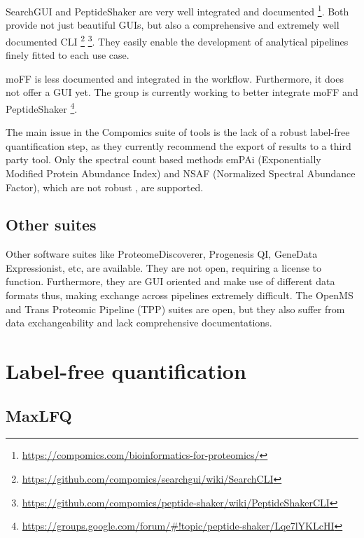 \documentclass[11pt, a4paper]{report}
\begin{document}
SearchGUI and PeptideShaker are very well integrated and documented \footnote{\href{https://compomics.com/bioinformatics-for-proteomics/}{https://compomics.com/bioinformatics-for-proteomics/}}. Both provide not just beautiful GUIs, but also a comprehensive and extremely well documented CLI \footnote{\href{https://github.com/compomics/searchgui/wiki/SearchCLI}{https://github.com/compomics/searchgui/wiki/SearchCLI}} \footnote{\href{https://github.com/compomics/peptide-shaker/wiki/PeptideShakerCLI}{https://github.com/compomics/peptide-shaker/wiki/PeptideShakerCLI}}. They easily enable the development of analytical pipelines finely fitted to each use case.

moFF is less documented and integrated in the workflow. Furthermore, it does not offer a GUI yet. The group is currently working to better integrate moFF and PeptideShaker \footnote{\href{https://groups.google.com/forum/\#!topic/peptide-shaker/Lqe7lYKLcHI}{https://groups.google.com/forum/\#!topic/peptide-shaker/Lqe7lYKLcHI}}.

The main issue in the Compomics suite of tools is the lack of a robust label-free quantification step, as they currently recommend the export of results to a third party tool. Only the spectral count based methods emPAi (Exponentially Modified Protein Abundance Index) and NSAF (Normalized Spectral Abundance Factor), which are not robust \cite{Griffin2010}, are supported.


\subsection{Other suites}

Other software suites like ProteomeDiscoverer, Progenesis QI, GeneData Expressionist, etc, are available. They are not open, requiring a license to function. Furthermore, they are GUI oriented and make use of different data formats thus, making exchange across pipelines extremely difficult. The OpenMS \cite{Sturm2008} and Trans Proteomic Pipeline (TPP) \cite{Deutsch2011} suites are open, but they also suffer from data exchangeability and lack comprehensive documentations.

\section{Label-free quantification}

\subsection{MaxLFQ}
\end{document}
